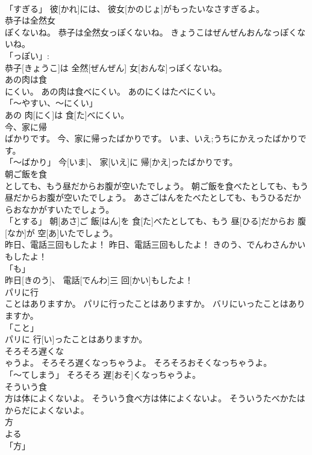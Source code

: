 \documentclass[8pt]{extreport}
\begin{document}
\begin{CJK}{UTF8}{min}
\\	「すぎる」	彼[かれ]には、 彼女[かのじょ]がもったいなさすぎるよ。		
\\	恭子は全然女
\\	ぽくないね。	恭子は全然女っぽくないね。	きょうこはぜんぜんおんなっぽくないね。	
\\	「っぽい」: 
\\	恭子[きょうこ]は 全然[ぜんぜん] 女[おんな]っぽくないね。		
\\	あの肉は食
\\	にくい。	あの肉は食べにくい。	あのにくはたべにくい。	
\\	「～やすい、～にくい」 
\\	あの 肉[にく]は 食[た]べにくい。		
\\	今、家に帰
\\	ばかりです。	今、家に帰ったばかりです。	いま、{いえ;うち}にかえったばかりです。	
\\	「～ばかり」	今[いま]、 家[いえ]に 帰[かえ]ったばかりです。		
\\	朝ご飯を食
\\	としても、もう昼だからお腹が空いたでしょう。	朝ご飯を食べたとしても、もう昼だからお腹が空いたでしょう。	あさごはんをたべたとしても、もうひるだからおなかがすいたでしょう。	
\\	「とする」	朝[あさ]ご 飯[はん]を 食[た]べたとしても、もう 昼[ひる]だからお 腹[なか]が 空[あ]いたでしょう。		
\\	昨日、電話三回もしたよ！	昨日、電話三回もしたよ！	きのう、でんわさんかいもしたよ！	
\\	「も」 
\\	昨日[きのう]、 電話[でんわ]三 回[かい]もしたよ！		
\\	パリに行
\\	ことはありますか。	パリに行ったことはありますか。	バリにいったことはありますか。	
\\	「こと」 
\\	パリに 行[い]ったことはありますか。		
\\	そろそろ遅くな
\\	ゃうよ。	そろそろ遅くなっちゃうよ。	そろそろおそくなっちゃうよ。	
\\	「～てしまう」	そろそろ 遅[おそ]くなっちゃうよ。		
\\	そういう食
\\	方は体によくないよ。	そういう食べ方は体によくないよ。	そういうたべかたはからだによくないよ。	
\\	方 
\\	よる 
\\	「方」 

\end{CJK}
\end{document}
